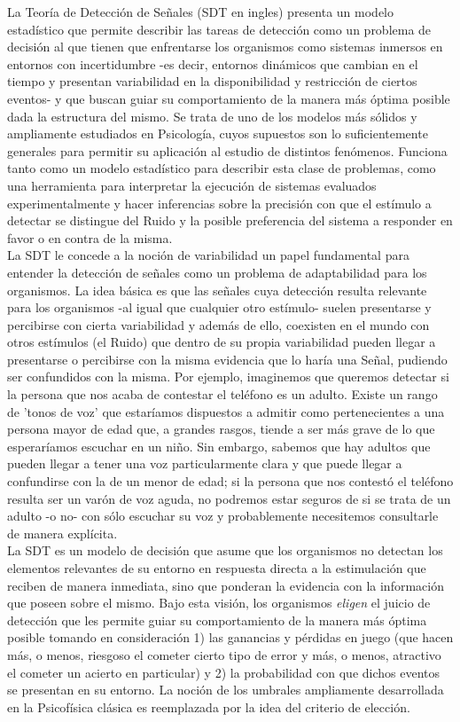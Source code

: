 La Teoría de Detección de Señales (SDT en ingles) presenta un modelo estadístico que permite describir las tareas de detección como un problema de decisión al que tienen que enfrentarse los organismos como sistemas inmersos en entornos con incertidumbre -es decir, entornos dinámicos que cambian en el tiempo y presentan variabilidad en la disponibilidad y restricción de ciertos eventos- y que buscan guiar su comportamiento de la manera más óptima posible dada la estructura del mismo. Se trata de uno de los modelos más sólidos y ampliamente estudiados en Psicología, cuyos supuestos son lo suficientemente generales para permitir su aplicación al estudio de distintos fenómenos. Funciona tanto como un modelo estadístico para describir esta clase de problemas, como una herramienta para interpretar la ejecución de  sistemas evaluados experimentalmente y hacer inferencias sobre la precisión con que el estímulo a detectar se distingue del Ruido y la posible preferencia del sistema a responder en favor o en contra de la misma.\\

La SDT le concede a la noción de variabilidad un papel fundamental para entender la detección de señales como un problema de adaptabilidad para los organismos. La idea básica es que las señales cuya detección resulta relevante para los organismos -al igual que cualquier otro estímulo- suelen presentarse y percibirse con cierta variabilidad y además de ello, coexisten en el mundo con otros estímulos (el Ruido) que dentro de su propia variabilidad pueden llegar a presentarse o percibirse con la misma evidencia que lo haría una Señal, pudiendo ser confundidos con la misma. Por ejemplo, imaginemos que queremos detectar si la persona que nos acaba de contestar el teléfono es un adulto. Existe un rango de 'tonos de voz' que estaríamos dispuestos a admitir como pertenecientes a una persona mayor de edad que, a grandes rasgos, tiende a ser más grave de lo que esperaríamos escuchar en un niño. Sin embargo, sabemos que hay adultos que pueden llegar a tener una voz particularmente clara y que puede llegar a confundirse con la de un menor de edad; si la persona que nos contestó el teléfono resulta ser un varón de voz aguda, no podremos estar seguros de si se trata de un adulto -o no- con sólo escuchar su voz y probablemente necesitemos consultarle de manera explícita.\\

La SDT es un modelo de decisión que asume que los organismos no detectan los elementos relevantes de su entorno en respuesta directa a la estimulación que reciben de manera inmediata, sino que ponderan la evidencia con la información que poseen sobre el mismo. Bajo esta visión, los organismos \textit{eligen} el juicio de detección que les permite guiar su comportamiento de la manera más óptima posible tomando en consideración 1) las ganancias y pérdidas en juego (que hacen más, o menos, riesgoso el cometer cierto tipo de error y más, o menos, atractivo el cometer un acierto en particular) y 2) la probabilidad con que dichos eventos se presentan en su entorno.  La noción de los umbrales ampliamente desarrollada en la Psicofísica clásica es reemplazada por la idea del criterio de elección.\\ 

